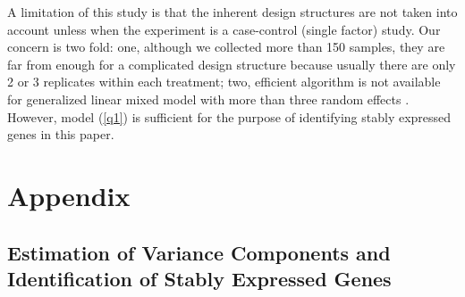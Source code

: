 \documentclass[11pt, a4paper]{article}
\begin{document}
A limitation of this study is that the inherent design structures are not taken into account unless when the experiment is a case-control (single factor) study. Our concern is two fold: one, although we collected more than 150 samples, they are far from enough for a complicated design structure because usually there are only 2 or 3 replicates within each treatment;  two, efficient algorithm is not available for generalized linear mixed model with more than three random effects \citep{bolker2009generalized}. However, model (\ref{q1}) is sufficient for the purpose of identifying stably expressed genes in this paper.



\section{Appendix}


\subsection*{ Estimation of Variance Components and Identification of Stably Expressed Genes}
\end{document}
